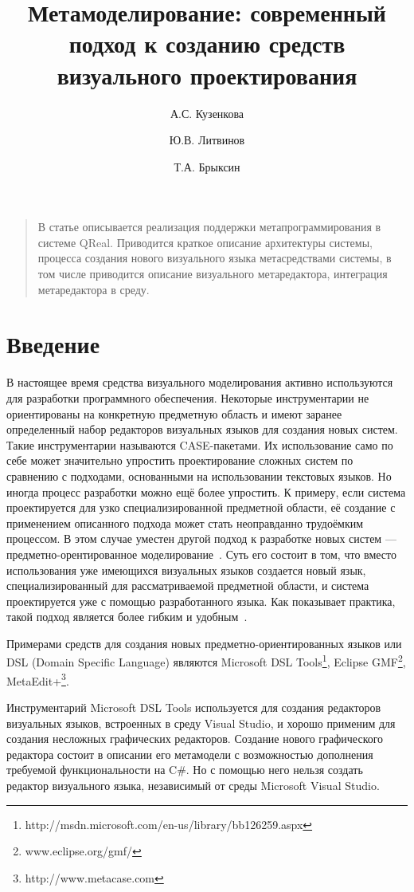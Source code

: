 \documentclass[a4paper]{article}
\title{Метамоделирование: современный подход к созданию средств визуального проектирования}
\author{А.С. Кузенкова \and Ю.В. Литвинов \and Т.А. Брыксин}
\date{}
\begin{document}
\maketitle
\thispagestyle{empty}

\begin{quote}
\small\noindent
В статье описывается реализация поддержки метапрограммирования в системе QReal. Приводится краткое описание архитектуры системы, процесса создания нового визуального языка метасредствами системы, в том числе приводится описание визуального метаредактора, интеграция метаредактора в среду.
\end{quote}

\section*{Введение}
В настоящее время средства визуального моделирования активно используются для разработки программного обеспечения. Некоторые инструментарии не ориентированы на конкретную предметную область и имеют заранее определенный набор редакторов визуальных языков для создания новых систем. Такие инструментарии называются CASE-пакетами. Их использование само по себе может значительно упростить проектирование сложных систем по сравнению с подходами, основанными на использовании текстовых языков. Но иногда процесс разработки можно ещё более упростить. К примеру, если система проектируется для узко специализированной предметной области, её создание с применением описанного подхода может стать неоправданно трудоёмким процессом. В этом случае уместен другой подход к разработке новых систем --- предметно-орентированное моделирование~\cite{theBook}. Суть его состоит в том, что вместо использования уже имеющихся визуальных языков создается новый язык, специализированный для рассматриваемой предметной области, и система проектируется уже с помощью разработанного языка. Как показывает практика, такой подход является более гибким и удобным~\cite{kieburtz}.

Примерами средств для создания новых предметно-ориентированных языков или DSL (Domain Specific Language) являются Microsoft DSL Tools\footnote{http://msdn.microsoft.com/en-us/library/bb126259.aspx}, Eclipse GMF\footnote{www.eclipse.org/gmf/}, MetaEdit+\footnote{http://www.metacase.com}.

Инструментарий Microsoft DSL Tools используется для создания редакторов визуальных языков, встроенных в среду Visual Studio, и хорошо применим для создания несложных графических редакторов. Создание нового графического редактора состоит в описании его метамодели с возможностью дополнения требуемой функциональности на C\#. Но с помощью него нельзя создать редактор визуального языка, независимый от среды Microsoft Visual Studio.
\end{document}
